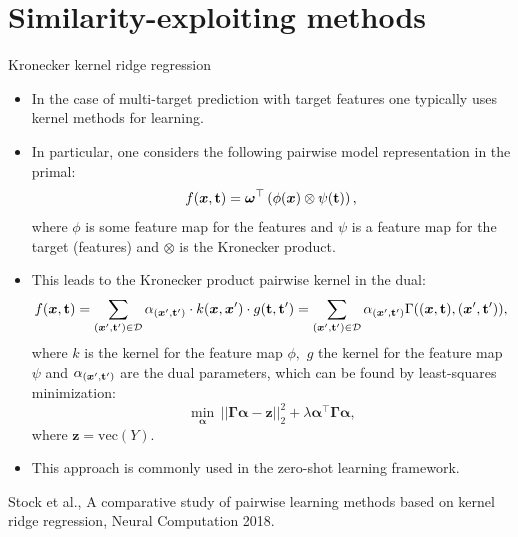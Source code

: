 \section{Similarity-exploiting methods}


\begin{frame}{Kronecker kernel ridge regression}
	\footnotesize
	\begin{itemize}
%		
	\item In the case of multi-target prediction with target features one typically uses kernel methods for learning.
%		
	\item In particular, one considers the following pairwise model representation in the primal: 
		\begin{equation*}
			\label{eq:pairwise}
			f(\bm{x},\mathbf{t}) = \bm\omega^\top \left(\phi(\bm{x}) \otimes \psi(\mathbf{t}) \right) ,
		\end{equation*}
%	
	where $\phi$ is some feature map for the features and $\psi$ is a feature map for the target (features) and $\otimes$ is the Kronecker product.
%
	\item This leads to the Kronecker product pairwise kernel in the dual:
%	
	\begin{eqnarray*} 
		f(\bm{x},\mathbf{t})= \sum_{(\bm{x}',\mathbf{t}') \in \mathcal{D}} \alpha_{(\bm{x}',\mathbf{t}')}  \cdot  k(\bm{x},\bm{x}') \cdot g(\mathbf{t},\mathbf{t}')  = \sum_{(\bm{x}',\mathbf{t}') \in \mathcal{D}} \alpha_{(\bm{x}',\mathbf{t}')} \Gamma((\bm{x},\mathbf{t}),(\bm{x}',\mathbf{t}')),
	\end{eqnarray*}
%
	where $k$ is the kernel for the feature map $\phi,$  $g$ the kernel for the feature map $\psi$  and $\alpha_{(\bm{x}',\mathbf{t}')}$ are the dual parameters, which can be found by least-squares minimization:
%	 
	$$ \min_{\bm{\alpha}} \, ||\bm{\Gamma}\bm{\alpha} -\bm{z} ||^2_2 +\lambda\bm{\alpha }^\top \bm{\Gamma}\bm{\alpha}, $$
%	
	where $\bm{z} = \mathrm{vec}{(Y)}.$
%
%
	\item This approach is commonly used in the zero-shot learning framework.

%
\end{itemize}
%	
	{\tiny Stock et al., A comparative study of pairwise learning methods based on kernel ridge regression, Neural Computation 2018.}
%	
\end{frame}



